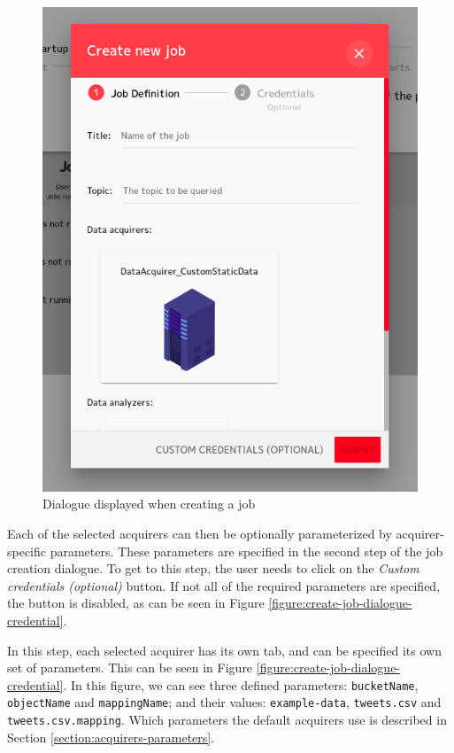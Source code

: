 \documentclass{article}
\begin{document}
\begin{figure}[h]
\includegraphics[scale=2]{images/create_job_dialogue.png}
\centering
\caption{Dialogue displayed when creating a job}
\label{figure:create-job-dialogue}
\end{figure}

Each of the selected acquirers can then be optionally parameterized by acquirer-specific parameters. These parameters are specified in the second step of the job creation dialogue. To get to this step, the user needs to click on the \textit{Custom credentials (optional)} button. If not all of the required parameters are specified, the button is disabled, as can be seen in Figure \ref{figure:create-job-dialogue-credential}. 

In this step, each selected acquirer has its own tab, and can be specified its own set of parameters. This can be seen in Figure \ref{figure:create-job-dialogue-credential}. In this figure, we can see three defined parameters: \texttt{bucketName}, \texttt{objectName} and \texttt{mappingName}; and their values: \texttt{example-data}, \texttt{tweets.csv} and \texttt{tweets.csv.mapping}. Which parameters the default acquirers use is described in Section \ref{section:acquirers-parameters}.
\end{document}
